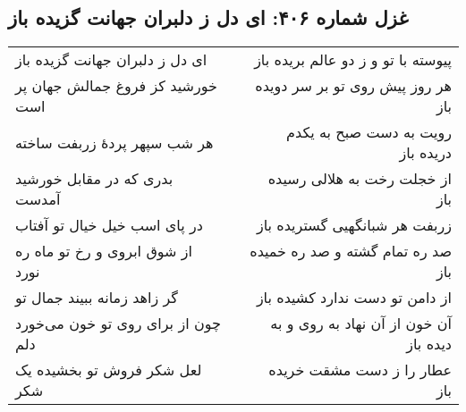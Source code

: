 \begin{center}
\section*{غزل شماره ۴۰۶: ای دل ز دلبران جهانت گزیده باز}
\label{sec:406}
\begin{longtable}{l p{0.5cm} r}
ای دل ز دلبران جهانت گزیده باز
&&
پیوسته با تو و ز دو عالم بریده باز
\\
خورشید کز فروغ جمالش جهان پر است
&&
هر روز پیش روی تو بر سر دویده باز
\\
هر شب سپهر پردهٔ زربفت ساخته
&&
رویت به دست صبح به یکدم دریده باز
\\
بدری که در مقابل خورشید آمدست
&&
از خجلت رخت به هلالی رسیده باز
\\
در پای اسب خیل خیال تو آفتاب
&&
زربفت هر شبانگهیی گستریده باز
\\
از شوق ابروی و رخ تو ماه ره نورد
&&
صد ره تمام گشته و صد ره خمیده باز
\\
گر زاهد زمانه ببیند جمال تو
&&
از دامن تو دست ندارد کشیده باز
\\
چون از برای روی تو خون می‌خورد دلم
&&
آن خون از آن نهاد به روی و به دیده باز
\\
لعل شکر فروش تو بخشیده یک شکر
&&
عطار را ز دست مشقت خریده باز
\\
\end{longtable}
\end{center}
